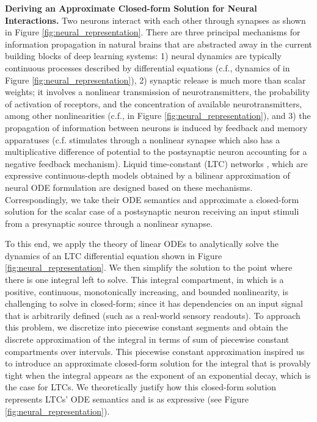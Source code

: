 \documentclass[12pt]{article}
\begin{document}
\noindent \textbf{Deriving an Approximate Closed-form Solution for Neural Interactions.} Two neurons interact with each other through synapses as shown in Figure \ref{fig:neural_representation}. There are three principal mechanisms for information propagation in natural brains that are abstracted away in the current building blocks of deep learning systems: 1) neural dynamics are typically continuous processes described by differential equations (c.f., dynamics of  in Figure \ref{fig:neural_representation}), 2) synaptic release is much more than scalar weights; it involves a nonlinear transmission of neurotransmitters, the probability of activation of receptors, and the concentration of available neurotransmitters, among other nonlinearities (c.f.,  in Figure \ref{fig:neural_representation}), and 3) the propagation of information between neurons is induced by feedback and memory apparatuses (c.f.  stimulates  through a nonlinear synapse  which also has a multiplicative difference of potential to the postsynaptic neuron accounting for a negative feedback mechanism). Liquid time-constant (LTC) networks \cite{hasani2021liquid}, which are expressive continuous-depth models obtained by a bilinear approximation \cite{friston2003dynamic} of neural ODE formulation \cite{chen2018neural} are designed based on these mechanisms. Correspondingly, we take their ODE semantics and approximate a closed-form solution for the scalar case of a postsynaptic neuron receiving an input stimuli from a presynaptic source through a nonlinear synapse. 

To this end, we apply the theory of linear ODEs \cite{PerkoODEs} to analytically solve the dynamics of an LTC differential equation shown in Figure \ref{fig:neural_representation}. We then simplify the solution to the point where there is one integral left to solve. This integral compartment,  in which  is a positive, continuous, monotonically increasing, and bounded nonlinearity, is challenging to solve in closed-form; since it has dependencies on an input signal  that is arbitrarily defined (such as a real-world sensory readouts). To approach this problem, we discretize  into piecewise constant segments and obtain the discrete approximation of the integral in terms of sum of piecewise constant compartments over intervals. This piecewise constant approximation inspired us to introduce an approximate closed-form solution for the integral  that is provably tight when the integral appears as the exponent of an exponential decay, which is the case for LTCs. We theoretically justify how this closed-form solution represents LTCs' ODE semantics and is as expressive (see Figure \ref{fig:neural_representation}). 
\end{document}
